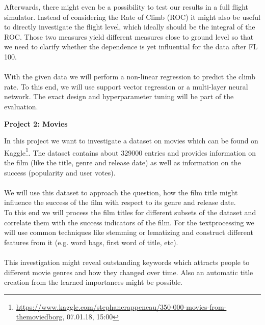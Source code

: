 \documentclass[11pt,a4paper]{article}
\begin{document}
	Afterwards, there might even be a possibility to test our results in a full flight simulator. Instead of considering the Rate of Climb (ROC) it might also be useful to directly investigate the flight level, which ideally should be the integral of the ROC. Those two measures yield different measures close to ground level so that we need to clarify whether the dependence is yet influential for the data after FL 100.\\
	\\
	With the given data we will perform a non-linear regression to predict the climb rate. To this end, we will use support vector regression or a multi-layer neural network. The exact design and hyperparameter tuning will be part of the evaluation.
	
	\bigskip
	\centerline{\large{\textbf{Project 2: Movies}}}
	\bigskip
	
	In this project we want to investigate a dataset on movies which can be found on Kaggle\footnote{\url{https://www.kaggle.com/stephanerappeneau/350-000-movies-from-themoviedborg}, 07.01.18, 15:00}. The dataset contains about 329000 entries and provides information on the film (like the title, genre and release date) as well as information on the success (popularity and user votes).\\
	\\
	We will use this dataset to approach the question, how the film title might influence the success of the film with respect to its genre and release date.\\
	To this end we will process the film titles for different subsets of the dataset and correlate them with the success indicators of the film. For the textprocessing we will use common techniques like stemming or lematizing and construct different features from it (e.g. word bags, first word of title, etc).\\
	\\
	This investigation might reveal outstanding keywords which attracts people to different movie genres and how they changed over time. Also an automatic title creation from the learned importances might be possible.
	
	
\end{document}
